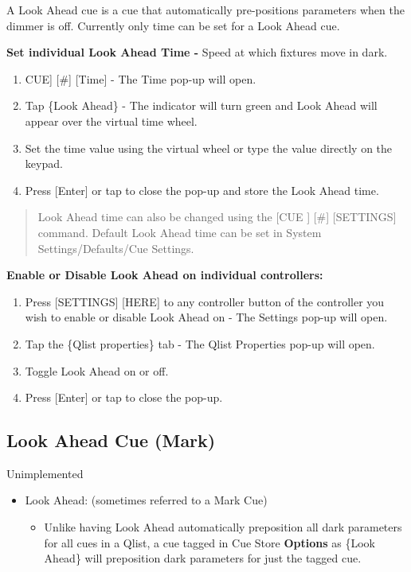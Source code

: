 \documentclass[
]{article}
\providecommand{\tightlist}{%
  \setlength{\itemsep}{0pt}\setlength{\parskip}{0pt}}
\begin{document}
A Look Ahead cue is a cue that automatically pre-positions parameters when the dimmer is off. Currently only time can be set for a Look Ahead cue.

\textbf{Set individual Look Ahead Time -} Speed at which fixtures move in dark.

\begin{enumerate}
\def\labelenumi{\arabic{enumi}.}
\item
  CUE{]} {[}\#{]} {[}Time{]} - The Time pop-up will open.
\item
  Tap \{Look Ahead\} - The indicator will turn green and Look Ahead will appear over the virtual time wheel.
\item
  Set the time value using the virtual wheel or type the value directly on the keypad.
\item
  Press {[}Enter{]} or tap to close the pop-up and store the Look Ahead time.
\end{enumerate}

\begin{quote}
Look Ahead time can also be changed using the {[}CUE {]} {[}\#{]} {[}SETTINGS{]} command. Default Look Ahead time can be set in System Settings/Defaults/Cue Settings.
\end{quote}

\textbf{Enable or Disable Look Ahead on individual controllers:}

\begin{enumerate}
\def\labelenumi{\arabic{enumi}.}
\item
  Press {[}SETTINGS{]} {[}HERE{]} to any controller button of the controller you wish to enable or disable Look Ahead on - The Settings pop-up will open.
\item
  Tap the \{Qlist properties\} tab - The Qlist Properties pop-up will open.
\item
  Toggle Look Ahead on or off.
\item
  Press {[}Enter{]} or tap to close the pop-up.
\end{enumerate}

\hypertarget{look-ahead-cue-mark}{%
\subsection{Look Ahead Cue (Mark)}\label{look-ahead-cue-mark}}

{Unimplemented}

\begin{itemize}
\item
  {Look Ahead: (sometimes referred to a Mark Cue) }

  \begin{itemize}
  \tightlist
  \item
    {Unlike having Look Ahead automatically preposition all dark parameters for all cues in a Qlist, a cue tagged in Cue Store \textbf{Options} as \{Look Ahead\} will preposition dark parameters for just the tagged cue.}
  \end{itemize}
\end{itemize}
\end{document}
